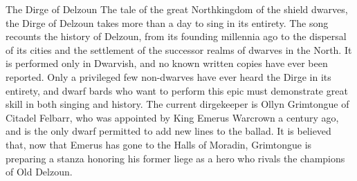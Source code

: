 \documentclass[10pt,a4paper,twoside,twocolumn,openany,bg=print,nodeprecatedcode]{dndbook}
\begin{document}
\begin{DndComment}{The Dirge of Delzoun}
The tale of the great Northkingdom of the shield dwarves, the Dirge of Delzoun takes more than a day to sing in its entirety. The song recounts the history of Delzoun, from its founding millennia ago to the dispersal of its cities and the settlement of the successor realms of dwarves in the North. It is performed only in Dwarvish, and no known written copies have ever been reported. Only a privileged few non-dwarves have ever heard the Dirge in its entirety, and dwarf bards who want to perform this epic must demonstrate great skill in both singing and history.
The current dirgekeeper is Ollyn Grimtongue of Citadel Felbarr, who was appointed by King Emerus Warcrown a century ago, and is the only dwarf permitted to add new lines to the ballad. It is believed that, now that Emerus has gone to the Halls of Moradin, Grimtongue is preparing a stanza honoring his former liege as a hero who rivals the champions of Old Delzoun.
\end{DndComment}
\end{document}
